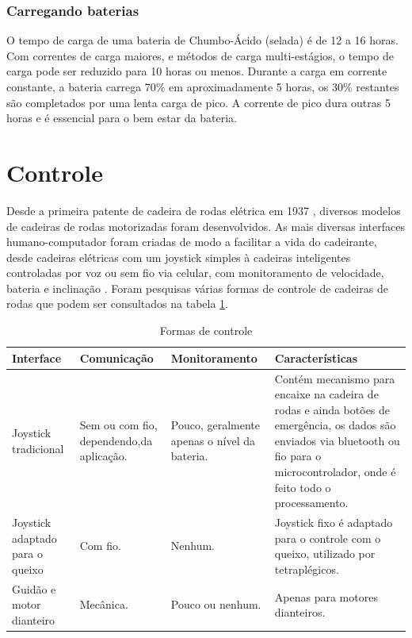 \subsubsection{Carregando baterias}

O tempo de carga de uma bateria de Chumbo-Ácido (selada) é de 12 a 16 horas. Com correntes de carga maiores, e métodos de carga multi-estágios, o tempo de carga pode ser reduzido para 10 horas ou menos. Durante a carga em corrente constante, a bateria carrega 70\% em aproximadamente 5 horas, os 30\% restantes são completados por uma lenta carga de pico. A corrente de pico dura outras 5 horas e é essencial para o bem estar da bateria.

\section{Controle}

Desde a primeira patente de cadeira de rodas elétrica em 1937 \cite{patent_cadeira_rodas_eletrica}, diversos modelos de cadeiras de rodas motorizadas foram desenvolvidos. As mais diversas interfaces humano-computador foram criadas de modo a facilitar a vida do cadeirante, desde cadeiras elétricas com um joystick simples à cadeiras inteligentes controladas por voz ou sem fio via celular, com monitoramento de velocidade, bateria e inclinação \cite{artigo_controle_cadeira_eletrica}. Foram pesquisas várias formas de controle de cadeiras de rodas que podem ser consultados na tabela \ref{tab:formas_controle}.

\begin{table}[!ht]
	\centering
	\label{tab:formas_controle}
	\begin{tabular}{p{2.5cm}|p{3cm}|p{3cm}|p{5cm}}
		\hline
		Interface & Comunicação & Monitoramento & Características \\ \hline
		Joystick tradicional & Sem ou com fio, dependendo,da aplicação. & Pouco, geralmente apenas o nível da bateria. & Contém mecanismo para encaixe na cadeira de rodas e ainda botões de emergência, os dados são enviados via bluetooth ou fio para o microcontrolador, onde é feito todo o processamento. \\ \hline
		Joystick adaptado para o queixo & Com fio. & Nenhum. & Joystick fixo é adaptado para o controle com o queixo, utilizado por tetraplégicos. \\ \hline
		Guidão e motor dianteiro & Mecânica. & Pouco ou nenhum. & Apenas para motores dianteiros. \\ \hline
	\end{tabular}
	\caption{Formas de controle}
\end{table}

